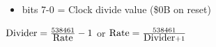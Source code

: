 \begin{itemize}
\item bits 7-0 = Clock divide value (\$0B on reset)
\end{itemize}
$\hbox{Divider}=\frac{538461}{\hbox{Rate}}-1$ or
$\hbox{Rate}=\frac{538461}{\hbox{Divider}+1}$

